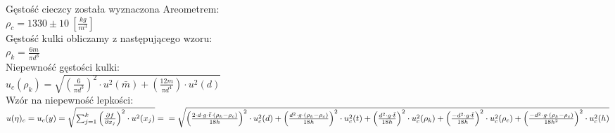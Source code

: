 \documentclass{article}
\begin{document}
Gęstość cieczcy została wyznaczona Areometrem:\\
$\rho_{c}=1330 \pm10 \ \left[\frac{kg}{m^{3}}\right]$\\
Gęstość kulki obliczamy z następującego wzoru:\\
$\rho_{k}=\frac{6m}{\pi d^{3}}$\\
Niepewność gęstości kulki:\\
$u_{c}(\rho_{k})=\sqrt{\left(\frac{6}{\pi d^{3}}\right)^{2}\cdot u^{2}(\bar{m}) + \left(\frac{12m}{\pi d^{4}}\right)\cdot u^{2}(d)}$\\
Wzór na niepewność lepkości:\\
$u(\eta)_{c}=u_{c}(y)=\sqrt{\sum^{k}_{j=1}\left(\frac{\partial f}{\partial x_{j}}\right)^{2}\cdot u^{2}(x_{j})}=  \\= \sqrt{\left(\frac{ 2\cdot d\cdot g\cdot \bar{t}\cdot (\rho_{k}-\rho_{c})  }{ 18h  }\right)^{2}\cdot u_{c}^{2}( d  )+
\left(\frac{ d^{2}\cdot g\cdot (\rho_{k}-\rho_{c})  }{ 18h  }\right)^{2}\cdot u_{c}^{2}( t  )+
\left(\frac{ d^{2}\cdot g\cdot \bar{t}  }{ 18h  }\right)^{2}\cdot u_{c}^{2}( \rho_{k}  )+
\left(\frac{ -d^{2}\cdot g\cdot \bar{t}  }{ 18h  }\right)^{2}\cdot u_{c}^{2}( \rho_{c}  )+
\left(\frac{ -d^{2}\cdot g\cdot (\rho_{k}-\rho_{c})  }{ 18h^{2}  }\right)^{2}\cdot u_{c}^{2}( h  )   }$\\
\end{document}

